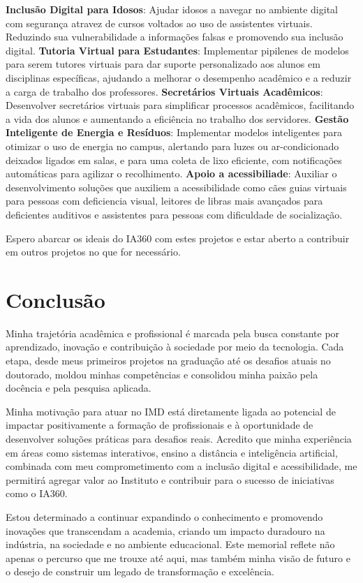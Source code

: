 \documentclass[10pt,a4paper,oneside]{book}
\begin{document}
\textbf{Inclusão Digital para Idosos}: Ajudar idosos a navegar no ambiente digital com segurança atravez de cursos
voltados ao uso de assistentes virtuais. Reduzindo sua vulnerabilidade a informações falsas e promovendo sua inclusão digital.
\textbf{Tutoria Virtual para Estudantes}: Implementar pipilenes de modelos para serem tutores virtuais para dar
suporte personalizado aos alunos em disciplinas específicas, ajudando a melhorar o desempenho acadêmico e a reduzir a carga de trabalho dos professores.
\textbf{Secretários Virtuais Acadêmicos}: Desenvolver secretários virtuais para simplificar processos acadêmicos,
facilitando a vida dos alunos e aumentando a eficiência no trabalho dos servidores.
\textbf{Gestão Inteligente de Energia e Resíduos}: Implementar modelos inteligentes para otimizar o uso de energia
no campus, alertando para luzes ou ar-condicionado deixados ligados em salas, e para uma coleta de lixo eficiente, com
notificações automáticas para agilizar o recolhimento.
\textbf{Apoio a acessibiliade}: Auxiliar  o desenvolvimento soluções que auxiliem a acessibilidade como cães guias
virtuais para pessoas com deficiencia visual, leitores de libras mais avançados para deficientes auditivos e assistentes
para pessoas com dificuldade de socialização.

Espero abarcar os ideais do IA360 com estes projetos e estar aberto a contribuir em outros projetos no que for necessário.


\chapter{Conclusão}
\label{cap_conclusao}

Minha trajetória acadêmica e profissional é marcada pela busca constante por aprendizado, inovação e contribuição à
sociedade por meio da tecnologia. Cada etapa, desde meus primeiros projetos na graduação até os desafios atuais no
doutorado, moldou minhas competências e consolidou minha paixão pela docência e pela pesquisa aplicada.

Minha motivação para atuar no IMD está diretamente ligada ao potencial de impactar positivamente a formação de
profissionais e à oportunidade de desenvolver soluções práticas para desafios reais. Acredito que minha experiência
em áreas como sistemas interativos, ensino a distância e inteligência artificial, combinada com meu comprometimento
com a inclusão digital e acessibilidade, me permitirá agregar valor ao Instituto e contribuir para o sucesso de
iniciativas como o IA360.

Estou determinado a continuar expandindo o conhecimento e promovendo inovações que transcendam a academia, criando um
impacto duradouro na indústria, na sociedade e no ambiente educacional. Este memorial reflete não apenas o percurso
que me trouxe até aqui, mas também minha visão de futuro e o desejo de construir um legado de transformação e excelência.



\backmatter


\end{document}
